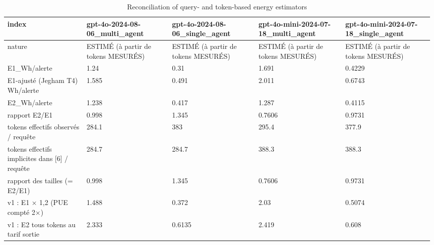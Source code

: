 \begin{table}[!t]
\centering
\caption{Reconciliation of query- and token-based energy estimators}
\label{tab:recon}
\begin{tabular}{lllll}
\hline
index & gpt-4o-2024-08-06\_multi\_agent & gpt-4o-2024-08-06\_single\_agent & gpt-4o-mini-2024-07-18\_multi\_agent & gpt-4o-mini-2024-07-18\_single\_agent \\
\hline
nature & ESTIMÉ (à partir de tokens MESURÉS) & ESTIMÉ (à partir de tokens MESURÉS) & ESTIMÉ (à partir de tokens MESURÉS) & ESTIMÉ (à partir de tokens MESURÉS) \\
E1\_Wh/alerte & 1.24 & 0.31 & 1.691 & 0.4229 \\
E1-ajusté (Jegham T4) Wh/alerte & 1.585 & 0.491 & 2.011 & 0.6743 \\
E2\_Wh/alerte & 1.238 & 0.417 & 1.287 & 0.4115 \\
rapport E2/E1 & 0.998 & 1.345 & 0.7606 & 0.9731 \\
tokens effectifs observés / requête & 284.1 & 383 & 295.4 & 377.9 \\
tokens effectifs implicites dans [6] / requête & 284.7 & 284.7 & 388.3 & 388.3 \\
rapport des tailles (= E2/E1) & 0.998 & 1.345 & 0.7606 & 0.9731 \\
v1 : E1 × 1,2 (PUE compté 2×) & 1.488 & 0.372 & 2.03 & 0.5074 \\
v1 : E2 tous tokens au tarif sortie & 2.333 & 0.6135 & 2.419 & 0.608 \\
\hline
\end{tabular}
\end{table}

